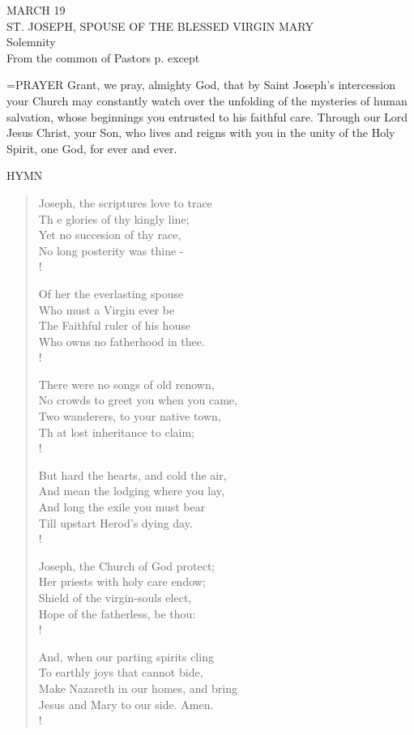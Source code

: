 \begin{center}\normalsize MARCH 19\\
\footnotesize ST. JOSEPH, SPOUSE OF THE BLESSED VIRGIN MARY \\
\footnotesize Solemnity\\
\footnotesize From the common of Pastors p.    except \\
\end{center}

\hangindent=\parindent \small{PRAYER 
Grant, we pray, almighty God,
that by Saint Joseph’s intercession
your Church may constantly watch over
the unfolding of the mysteries of human salvation,
whose beginnings you entrusted to his faithful care.
Through our Lord Jesus Christ, your Son,
who lives and reigns with you in the unity of the Holy Spirit,
one God, for ever and ever.\\}
 
\noindent\small{\uppercase{Hymn}}\normalsize\label{proper:josephSpouse:hymn}
\begin{verse}
Joseph, the scriptures love to trace\\
Th e glories of thy kingly line;\\
Yet no succesion of thy race,\\
No long posterity was thine -\\!

Of her the everlasting spouse\\
Who must a Virgin ever be\\
The Faithful ruler of his house\\
Who owns no fatherhood in thee.\\!

There were no songs of old renown,\\
No crowds to greet you when you came,\\
Two wanderers, to your native town,\\
Th at lost inheritance to claim;\\!

But hard the hearts, and cold the air,\\
And mean the lodging where you lay,\\
And long the exile you must bear\\
Till upstart Herod’s dying day.\\!

Joseph, the Church of God protect;\\
Her priests with holy care endow;\\
Shield of the virgin-souls elect,\\
Hope of the fatherless, be thou:\\!

And, when our parting spirits cling\\
To earthly joys that cannot bide,\\
Make Nazareth in our homes, and bring\\
Jesus and Mary to our side. Amen.\\!
\end{verse}

